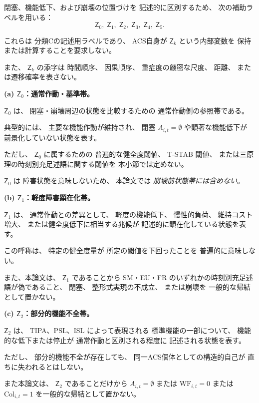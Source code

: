 \begin{remark}[閉塞・崩壊周辺の記述的状態帯]
\label{rem:descriptive_zones}
閉塞、機能低下、および崩壊の位置づけを
記述的に区別するため、
次の補助ラベルを用いる：
\[
  \mathsf{Z}_0,\;
  \mathsf{Z}_1,\;
  \mathsf{Z}_2,\;
  \mathsf{Z}_3,\;
  \mathsf{Z}_4,\;
  \mathsf{Z}_5.
\]

これらは
分類Cの記述用ラベルであり、
ACS自身が
$\mathsf{Z}_k$ という内部変数を
保持または計算することを要求しない。

また、
$\mathsf{Z}_k$ の添字は
時間順序、
因果順序、
重症度の厳密な尺度、
距離、
または遷移確率を表さない。

\medskip
\noindent
\textbf{(a) $\mathsf{Z}_0$：通常作動・基準帯。}

$\mathsf{Z}_0$ は、
閉塞・崩壊周辺の状態を比較するための
通常作動側の参照帯である。

典型的には、
主要な機能作動が維持され、
閉塞
$A_{i,t}=\emptyset$
や顕著な機能低下が
前景化していない状態を表す。

ただし、
$\mathsf{Z}_0$ に属するための
普遍的な健全度閾値、
T-STAB 閾値、
または三原理の時刻別充足述語に関する閾値を
本小節では定めない。

$\mathsf{Z}_0$ は
障害状態を意味しないため、
本論文では
\emph{崩壊前状態帯には含めない}。

\medskip
\noindent
\textbf{(b) $\mathsf{Z}_1$：軽度障害顕在化帯。}

$\mathsf{Z}_1$ は、
通常作動との差異として、
軽度の機能低下、
慢性的負荷、
維持コスト増大、
または健全度低下に相当する兆候が
記述的に顕在化している状態を表す。

この呼称は、
特定の健全度量が
所定の閾値を下回ったことを
普遍的に意味しない。

また、本論文は、
$\mathsf{Z}_1$ であることから
SM・EU・FR のいずれかの時刻別充足述語が偽であること、
閉塞、
整形式実現の不成立、
または崩壊を
一般的な帰結として置かない。

\medskip
\noindent
\textbf{(c) $\mathsf{Z}_2$：部分的機能不全帯。}

$\mathsf{Z}_2$ は、
TIPA、PSL、ISL によって表現される
標準機能の一部について、
機能的な低下または停止が
通常作動と区別される程度に
記述される状態を表す。

ただし、
部分的機能不全が存在しても、
同一ACS個体としての構造的自己が
直ちに失われるとはしない。

また本論文は、
$\mathsf{Z}_2$ であることだけから
$A_{i,t}=\emptyset$
または
$\mathrm{WF}_{i,t}=0$
または
$\mathrm{Col}_{i,t}=1$
を一般的な帰結として置かない。


\end{remark}
